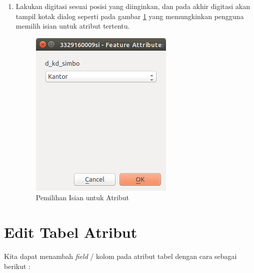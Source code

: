 \begin{enumerate}[1.]
  \item Lakukan digitasi sesuai posisi yang diinginkan, dan pada akhir digitasi akan tampil kotak dialog seperti pada gambar \ref{fig:pilihanatribut} yang memungkinkan pengguna memilih isian untuk atribut tertentu.
  
  \begin{figure}[H]
    \centering
    \includegraphics[scale=1]{./resources/041-pilihan-atribut}
    \caption{Pemilihan Isian untuk Atribut}
    \label{fig:pilihanatribut}
  \end{figure}
  
\end{enumerate}

\section{Edit Tabel Atribut}

Kita dapat menambah \textit{field} / kolom pada atribut tabel dengan cara sebagai berikut :

